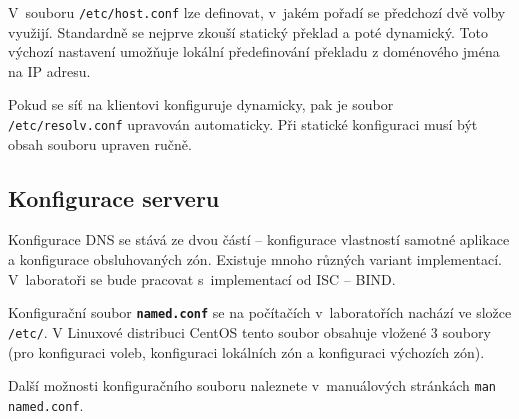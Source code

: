 V~souboru {\tt /etc/host.conf} lze definovat, v~jakém pořadí se předchozí dvě volby využijí. Standardně se nejprve zkouší statický překlad a poté dynamický. Toto výchozí nastavení umožňuje lokální předefinování překladu z doménového jména na IP adresu.

Pokud se síť na klientovi konfiguruje dynamicky, pak je soubor {\tt /etc/resolv.conf} upravován automaticky. Při statické konfiguraci musí být obsah souboru upraven ručně.

\subsection{Konfigurace serveru}
Konfigurace DNS se stává ze dvou částí -- konfigurace vlastností samotné aplikace a konfigurace obsluhovaných zón. Existuje mnoho různých variant implementací. V~laboratoři se bude pracovat s~implementací od ISC -- BIND.

Konfigurační soubor {\tt\bf named.conf} se na počítačích v~laboratořích nachází ve složce {\tt
/etc/}. V Linuxové distribuci CentOS tento soubor obsahuje vložené 3 soubory (pro konfiguraci voleb,
konfiguraci lokálních zón a konfiguraci výchozích zón).

%
%
%
%
%
%
%
%
%

Další možnosti konfiguračního souboru naleznete v~manuálových stránkách {\tt man named.conf}.

